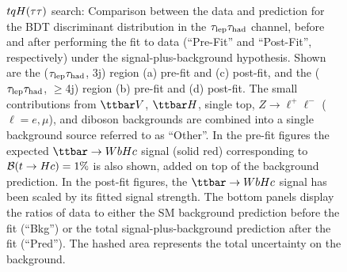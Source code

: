 \begin{figure}[htbp]
\begin{center}
\caption{\small{$tqH(\tau\tau)$ search: Comparison between the data and prediction for the BDT discriminant distribution in the
$\tau_{\mathrm{lep}} \tau_{\mathrm{had}}$ channel, before and after performing the fit to data  (``Pre-Fit'' and ``Post-Fit'', respectively) under the signal-plus-background hypothesis.
Shown are the ($\tau_{\mathrm{lep}} \tau_{\mathrm{had}}$, 3j) region (a) pre-fit and (c) post-fit, and the ($\tau_{\mathrm{lep}} \tau_{\mathrm{had}}$, $\geq$4j) region (b) pre-fit and (d) post-fit.
The small contributions from $\ttbar V$, $\ttbar H$, single top, $Z\to \ell^+\ell^-$ ($\ell = e, \mu$), and diboson backgrounds are combined 
into a single background source referred to as ``Other''. 
In the pre-fit figures the expected $\Hc$ signal (solid red) corresponding to $\mathcal{B}(t\to Hc)=1\%$ is also shown,
added on top of the background prediction. In the post-fit figures, the $\Hc$ signal has been scaled by its fitted signal strength.
The bottom panels display the ratios of data to either the SM background prediction before the fit (``Bkg'')  or the total signal-plus-background
prediction after the fit (``Pred''). 
The hashed area represents the total uncertainty on the background. }}
\label{fig:prepostfit_unblinded_WbHc_lh}
\end{center}
\end{figure}

